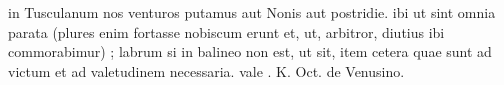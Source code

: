 


in Tusculanum nos venturos putamus aut Nonis aut postridie. ibi ut sint omnia parata (plures enim fortasse
nobiscum erunt et, ut, arbitror, diutius ibi commorabimur) ; labrum si in balineo non est, ut sit, item cetera quae sunt ad victum et ad valetudinem necessaria. vale .  K. Oct. de Venusino.

